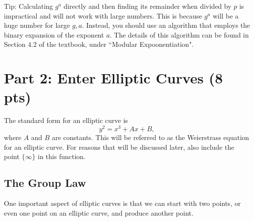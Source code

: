 \documentclass{article}
\begin{document}
\begin{tcolorbox}[enhanced,interior style={top color=Plum!20,bottom color=Plum!40}]
        \vspace{2mm}
        Tip: Calculating $g^{a}$ directly and then finding its remainder when divided by $p$ is impractical and will not work with large numbers. This is because $g^{a}$ will be a huge number for large $g, a$. Instead, you should use an algorithm that employs the binary expansion of the exponent $a$. The details of this algorithm can be found in Section 4.2 of the textbook, under ``Modular Expoonentiation".
    \end{tcolorbox}



\section*{Part 2: Enter Elliptic Curves (8 pts)}

The standard form for an elliptic curve is $$y^{2} = x^{3} + Ax + B,$$ where $A$ and $B$ are constants.  This will be referred to as the Weierstrass equation for an elliptic curve. For reasons that will be discussed later, also include the point $\{\infty\}$ in this function.

\subsection*{The Group Law}
    One important aspect of elliptic curves is that we can start with two points, or even one point on an elliptic curve, and produce another point.
\end{document}
